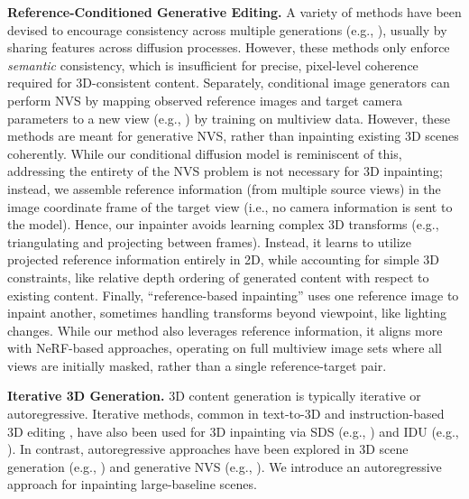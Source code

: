 \noindent\textbf{Reference-Conditioned Generative Editing.}
A variety of methods have been devised to encourage consistency across multiple generations
(e.g., \cite{tewel2024training,zhou2024storydiffusion,avrahami2024chosen,sajnani2024geodiffuser}), 
usually by sharing features across diffusion processes.
However, these methods only enforce \emph{semantic} consistency, which is insufficient for precise, pixel-level coherence required for 3D-consistent content.
Separately, conditional image generators can perform NVS
by mapping observed reference images and target camera parameters to a new view (e.g., \cite{liu2023zero,shi2023zero123++,yang2024consistnet,gao2024cat3d,yu2024polyoculus,tseng2023consistent,yu2023long,chan2023generative,yu2024viewcrafter}) by training on multiview data.
However, these methods are meant for generative NVS, rather than inpainting existing 3D scenes coherently.
While our conditional diffusion model is reminiscent of this, addressing the entirety of the NVS problem is not necessary for 3D inpainting; instead, we assemble reference information (from multiple source views) in the image coordinate frame of the target view (i.e., no camera information is sent to the model).
Hence, our inpainter avoids learning complex 3D transforms (e.g., triangulating and projecting between frames). Instead, it learns to utilize projected reference information entirely in 2D, while accounting for simple 3D constraints, like relative depth ordering of generated content with respect to existing content.
Finally, ``reference-based inpainting'' \cite{zhao2023geofill,zhao20223dfill,zhou2021transfill} uses one reference image to inpaint another, sometimes handling transforms beyond viewpoint, like lighting changes. While our method also leverages reference information, it aligns more with NeRF-based approaches, operating on full multiview image sets where all views are initially masked, rather than a single reference-target pair.

\noindent\textbf{Iterative 3D Generation.} 
3D content generation is typically iterative or autoregressive. Iterative methods,
common in text-to-3D \cite{poole2022dreamfusion,mcallister2024rethinkingsds} and instruction-based 3D editing \cite{in2n}, have also been used for 3D inpainting via SDS \cite{poole2022dreamfusion} (e.g., \cite{prabhu2023inpaint3d,mirzaei2024reffusion,chen2024mvip}) and IDU \cite{in2n} (e.g., \cite{weber2024nerfiller}).
In contrast, autoregressive approaches have been explored in 3D scene generation (e.g., \cite{chung2023luciddreamer,hoellein2023text2room}) and generative NVS (e.g., \cite{yu2023long,liu2021infinitenature,rombach2021geogpt,ren2022lookout,tseng2023consistent}). We introduce an autoregressive approach for inpainting large-baseline scenes.







